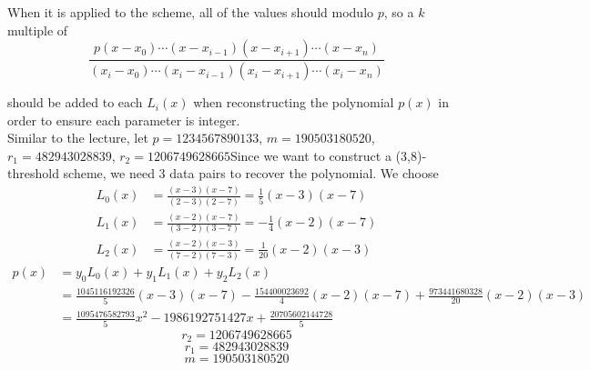 \documentclass{article}
\begin{document}
	When it is applied to the scheme, all of the values should modulo $p$, so a $k$ multiple of $$\frac{p(x-x_0)\cdots(x-x_{i-1})(x-x_{i+1})\cdots(x-x_n)}{(x_i-x_0)\cdots(x_i-x_{i-1})(x_i-x_{i+1})\cdots(x_i-x_n)}$$ 
	
	should be added to each $L_i(x)$ when reconstructing the polynomial $p(x)$ in order to ensure each parameter is integer. \\
	
	Similar to the lecture, let $p=1234567890133$, $m=190503180520$, $r_1=482943028839$, $r_2=1206749628665$Since we want to construct a (3,8)-threshold scheme, we need 3 data pairs to recover the polynomial. We choose
	\begin{align*}
		L_0(x) &= \frac{(x-3)(x-7)}{(2-3)(2-7)}=\frac{1}{5}(x-3)(x-7) \\
		L_1(x) &= \frac{(x-2)(x-7)}{(3-2)(3-7)}=-\frac{1}{4}(x-2)(x-7) \\
		L_2(x) &= \frac{(x-2)(x-3)}{(7-2)(7-3)}=\frac{1}{20}(x-2)(x-3)
	\end{align*}
	\begin{align*}
		p(x) &= y_0L_0(x)+y_1L_1(x)+y_2L_2(x) \\
		&= \frac{1045116192326}{5}(x-3)(x-7)-\frac{154400023692}{4}(x-2)(x-7)+\frac{973441680328}{20}(x-2)(x-3) \\
		&= \frac{1095476582793}{5}x^2-1986192751427x+\frac{20705602144728}{5}
	\end{align*}
	$$r_2 = 1206749628665 $$
	$$r_1 = 482943028839$$
	$$m = 190503180520 $$
\end{document}
